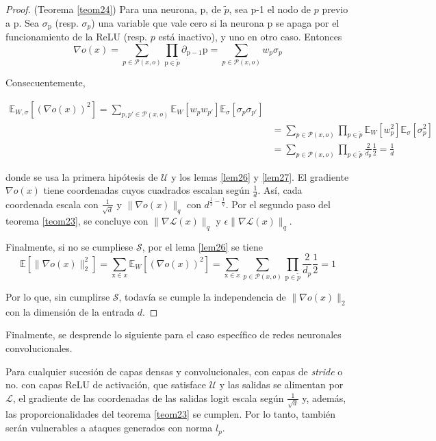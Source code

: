 \begin{proof} (Teorema \ref{teom24})
Para una neurona, p, de $\tilde{p}$, sea p-1 el nodo de $p$ previo a p. Sea $\sigma_{\text{p}}$ (resp. $\sigma_p$) una variable que vale cero si la neurona p se apaga por el funcionamiento de la ReLU (resp. $p$ está inactivo), y uno en otro caso. Entonces
$$\nabla o(x) = \sum_{p \in \mathcal{P}(x,o)} \prod_{\text{p} \in \tilde{p}} \partial_{\text{p}-1} \text{p} = \sum_{p \in \mathcal{P}(x,o)} w_p \sigma_p$$

Consecuentemente, 

\begin{align}
    \mathbb{E}_{W,\sigma}[(\nabla o(x))^2]=\sum_{p,p' \in \mathcal{P}(x,o)} \mathbb{E}_W[w_pw_{p'}]\mathbb{E}_{\sigma}[\sigma_p \sigma_{p'}] \\
    &=\sum_{p \in \mathcal{P}(x,o)} \prod_{p \in \tilde{p}} \mathbb{E}_W[w_p^2]\mathbb{E}_{\sigma}[\sigma_p^2] \\
    &=\sum_{p \in \mathcal{P}(x,o)} \prod_{p\in \tilde{p}} \frac{2}{d_p}\frac{1}{2}=\frac{1}{d}
\end{align}


donde se usa la primera hipótesis de $\mathcal{U}$ y los lemas \ref{lem26} y \ref{lem27}. El gradiente $\nabla o(x)$ tiene coordenadas cuyos cuadrados escalan según $\frac{1}{d}$. Así, cada coordenada escala con $\frac{1}{\sqrt{d}}$ y $\| \nabla o(x) \|_q$ con $d^{\frac{1}{2}-\frac{1}{q}}$. Por el segundo paso del teorema \ref{teom23}, se concluye con $\| \nabla \mathcal{L}(x) \|_q$ y $\epsilon \| \nabla \mathcal{L}(x) \|_q$.

Finalmente, si no se cumpliese $\mathcal{S}$, por el lema \ref{lem26} se tiene
$$\mathbb{E}[\| \nabla o(x) \|_2^2]=\sum_{\text{x} \in x} \mathbb{E}_W[(\nabla o(x))^2]=\sum_{\text{x} \in x} \sum_{p \in \mathcal{P}(x,o)} \prod_{\text{p} \in \tilde{p}} \frac{2}{d_p} \frac{1}{2}=1$$

Por lo que, sin cumplirse $\mathcal{S}$, todavía se cumple la independencia de $\| \nabla o(x) \|_2$ con la dimensión de la entrada $d$.

\end{proof}
Finalmente, se desprende lo siguiente para el caso específico de redes neuronales convolucionales.

\begin{corolario}
Para cualquier sucesión de capas densas y convolucionales, con capas de \textit{stride} o no. con capas ReLU de activación, que satisface $\mathcal{U}$ y las salidas se alimentan por $\mathcal{L}$, el gradiente de las coordenadas de las salidas logit escala según $\frac{1}{\sqrt{d}}$ y, además, las proporcionalidades del teorema \ref{teom23} se cumplen. Por lo tanto, también serán vulnerables a ataques generados con norma $l_p$.
\end{corolario}

